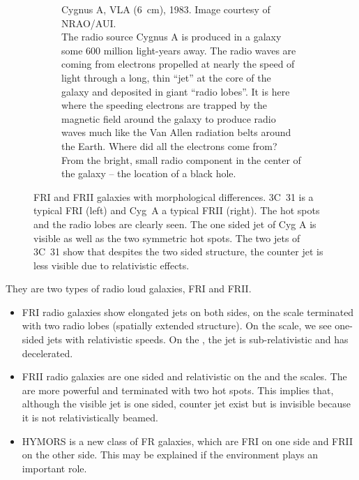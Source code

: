 \documentclass[10pt,a4paper,english]{article}
\begin{document}
\begin{figure}[!ht]
\begin{subfigure}[t]{.495\textwidth}
        \caption{
            Cygnus A, VLA (\SI{6}{\cm}), 1983. Image courtesy of
            NRAO/AUI.\vspace{1ex}\\
            The radio source Cygnus A is produced in a galaxy some 600 million
            light-years away. The radio waves are coming from electrons
            propelled at nearly the speed of light through a long, thin “jet”
            at the core of the galaxy and deposited in giant “radio lobes”. It
            is here where the speeding electrons are trapped by the magnetic
            field around the galaxy to produce radio waves much like the Van
            Allen radiation belts around the Earth. Where did all the electrons
            come from? From the bright, small radio component in the center of
            the galaxy -- the location of a black hole.
        }
    \end{subfigure}
    \caption{
        FRI and FRII galaxies with morphological differences. 3C~31 is a
        typical FRI (left) and Cyg~A a typical FRII (right). The hot spots and
        the radio lobes are clearly seen. The one sided jet of Cyg A is visible
        as well as the two symmetric hot spots. The two jets of 3C~31 show that
        despites the two sided structure, the counter jet is less visible due to
        relativistic effects.
    }
\end{figure}

They are two types of radio loud galaxies, FRI and FRII.
\begin{itemize}
    \item FRI radio galaxies show elongated jets on both sides, on the
          \si{\kpc} scale terminated with two radio lobes (spatially extended
          structure). On the \si{\pc} scale, we see one-sided jets with
          relativistic speeds. On the \si{\kpc}, the jet is sub-relativistic
          and has decelerated.
    \item FRII radio galaxies are one sided and relativistic on the \si{\pc}
          and the \si{\kpc} scales. The are more powerful and terminated with
          two hot spots. This implies that, although the visible jet is one
          sided, counter jet exist but is invisible because it is not
          relativistically beamed.
    \item HYMORS is a new class of FR galaxies, which are FRI on one side and
          FRII on the other side. This may be explained if the environment
          plays an important role.
\end{itemize}
\end{document}
